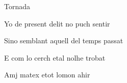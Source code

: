 \documentclass[12pt]{article}
\begin{document}
\begin{estrofaExtra}%




\begin{tornada}

\textsection{}Tornada

\end{tornada}


\end{estrofaExtra}


\begin{estrofa}

 Yo de present delit no puch sentir

 Sino semblant aquell del temps passat

 E com lo cerch etal nolhe trobat

 Amj matex etot lomon ahir

\end{estrofa}
\end{document}
